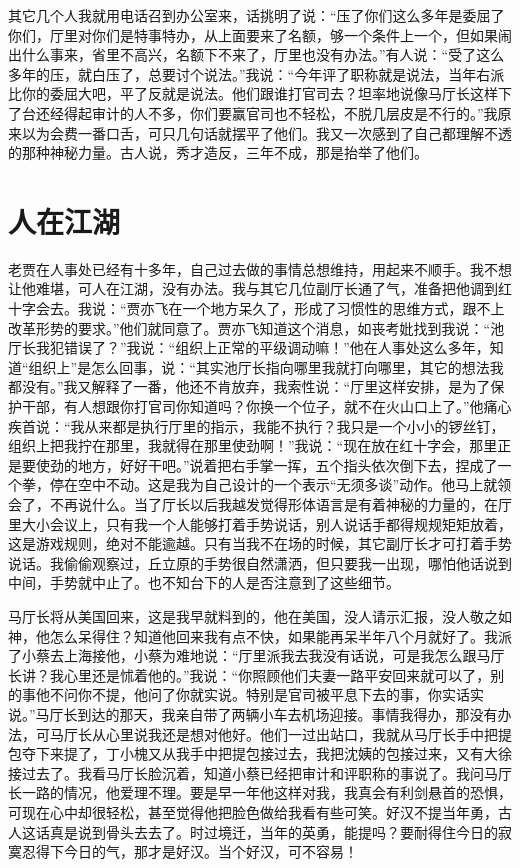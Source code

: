 \documentclass[12pt,oneside]{book}
\begin{document}
其它几个人我就用电话召到办公室来，话挑明了说：``压了你们这么多年是委屈了你们，厅里对你们是特事特办，从上面要来了名额，够一个条件上一个，但如果闹出什么事来，省里不高兴，名额下不来了，厅里也没有办法。''有人说：``受了这么多年的压，就白压了，总要讨个说法。''我说：``今年评了职称就是说法，当年右派比你的委屈大吧，平了反就是说法。他们跟谁打官司去？坦率地说像马厅长这样下了台还经得起审计的人不多，你们要赢官司也不轻松，不脱几层皮是不行的。''我原来以为会费一番口舌，可只几句话就摆平了他们。我又一次感到了自己都理解不透的那种神秘力量。古人说，秀才造反，三年不成，那是抬举了他们。


\chapter{人在江湖}

老贾在人事处已经有十多年，自己过去做的事情总想维持，用起来不顺手。我不想让他难堪，可人在江湖，没有办法。我与其它几位副厅长通了气，准备把他调到红十字会去。我说：``贾亦飞在一个地方呆久了，形成了习惯性的思维方式，跟不上改革形势的要求。''他们就同意了。贾亦飞知道这个消息，如丧考妣找到我说：``池厅长我犯错误了？''我说：``组织上正常的平级调动嘛！''他在人事处这么多年，知道``组织上''是怎么回事，说：``其实池厅长指向哪里我就打向哪里，其它的想法我都没有。''我又解释了一番，他还不肯放弃，我索性说：``厅里这样安排，是为了保护干部，有人想跟你打官司你知道吗？你换一个位子，就不在火山口上了。''他痛心疾首说：``我从来都是执行厅里的指示，我能不执行？我只是一个小小的锣丝钉，组织上把我拧在那里，我就得在那里使劲啊！''我说：``现在放在红十字会，那里正是要使劲的地方，好好干吧。''说着把右手掌一挥，五个指头依次倒下去，捏成了一个拳，停在空中不动。这是我为自己设计的一个表示``无须多谈''动作。他马上就领会了，不再说什么。当了厅长以后我越发觉得形体语言是有着神秘的力量的，在厅里大小会议上，只有我一个人能够打着手势说话，别人说话手都得规规矩矩放着，这是游戏规则，绝对不能逾越。只有当我不在场的时候，其它副厅长才可打着手势说话。我偷偷观察过，丘立原的手势很自然潇洒，但只要我一出现，哪怕他话说到中间，手势就中止了。也不知台下的人是否注意到了这些细节。

马厅长将从美国回来，这是我早就料到的，他在美国，没人请示汇报，没人敬之如神，他怎么呆得住？知道他回来我有点不快，如果能再呆半年八个月就好了。我派了小蔡去上海接他，小蔡为难地说：``厅里派我去我没有话说，可是我怎么跟马厅长讲？我心里还是怵着他的。''我说：``你照顾他们夫妻一路平安回来就可以了，别的事他不问你不提，他问了你就实说。特别是官司被平息下去的事，你实话实说。''马厅长到达的那天，我亲自带了两辆小车去机场迎接。事情我得办，那没有办法，可马厅长从心里说我还是想对他好。他们一过出站口，我就从马厅长手中把提包夺下来提了，丁小槐又从我手中把提包接过去，我把沈姨的包接过来，又有大徐接过去了。我看马厅长脸沉着，知道小蔡已经把审计和评职称的事说了。我问马厅长一路的情况，他爱理不理。要是早一年他这样对我，我真会有利剑悬首的恐惧，可现在心中却很轻松，甚至觉得他把脸色做给我看有些可笑。好汉不提当年勇，古人这话真是说到骨头去去了。时过境迁，当年的英勇，能提吗？要耐得住今日的寂寞忍得下今日的气，那才是好汉。当个好汉，可不容易！
\end{document}
